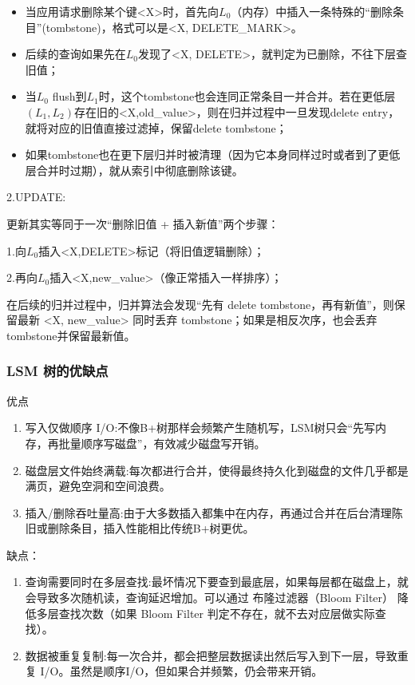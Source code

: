 \begin{itemize}
    \item 当应用请求删除某个键<X>时，首先向$L_0$（内存）中插入一条特殊的“删除条目”(tombstone)，格式可以是<X, DELETE\_MARK>。
    \item 后续的查询如果先在$L_0$发现了<X, DELETE>，就判定为已删除，不往下层查旧值；
    \item 当$L_0$ flush到$L_1$时，这个tombstone也会连同正常条目一并合并。若在更低层$(L_1,L_2)$存在旧的<X,old\_value>，则在归并过程中一旦发现delete entry，就将对应的旧值直接过滤掉，保留delete tombstone；
    \item 如果tombstone也在更下层归并时被清理（因为它本身同样过时或者到了更低层合并时过期），就从索引中彻底删除该键。
\end{itemize}

\noindent 2.UPDATE:

更新其实等同于一次“删除旧值 + 插入新值”两个步骤：

1.向$L_0$插入<X,DELETE>标记（将旧值逻辑删除）；

2.再向$L_0$插入<X,new\_value>（像正常插入一样排序）；

在后续的归并过程中，归并算法会发现“先有 delete tombstone，再有新值”，则保留最新 <X, new\_value> 同时丢弃 tombstone；如果是相反次序，也会丢弃 tombstone并保留最新值。

\subsubsection{LSM 树的优缺点}

\noindent 优点

\begin{enumerate}
    \item 写入仅做顺序 I/O:不像B+树那样会频繁产生随机写，LSM树只会“先写内存，再批量顺序写磁盘”，有效减少磁盘写开销。
    \item 磁盘层文件始终满载:每次都进行合并，使得最终持久化到磁盘的文件几乎都是满页，避免空洞和空间浪费。
    \item 插入/删除吞吐量高:由于大多数插入都集中在内存，再通过合并在后台清理陈旧或删除条目，插入性能相比传统B+树更优。
\end{enumerate}

\noindent 缺点：

\begin{enumerate}
    \item 查询需要同时在多层查找:最坏情况下要查到最底层，如果每层都在磁盘上，就会导致多次随机读，查询延迟增加。可以通过 布隆过滤器（Bloom Filter） 降低多层查找次数（如果 Bloom Filter 判定不存在，就不去对应层做实际查找）。
    \item 数据被重复复制:每一次合并，都会把整层数据读出然后写入到下一层，导致重复 I/O。虽然是顺序I/O，但如果合并频繁，仍会带来开销。
\end{enumerate}

